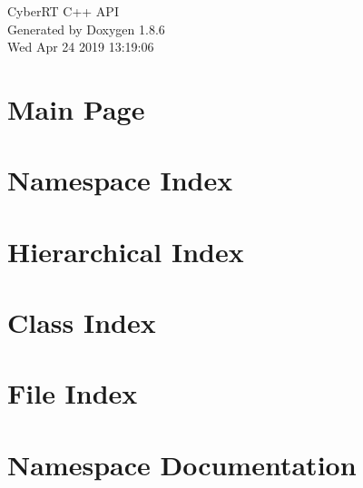 \documentclass[twoside]{book}
\newcommand{\clearemptydoublepage}{%
  \newpage{\pagestyle{empty}\cleardoublepage}%
}
\begin{document}
\hypersetup{pageanchor=false}
\begin{titlepage}
\vspace*{7cm}
\begin{center}%
{\Large Cyber\-R\-T C++ A\-P\-I }\\
\vspace*{1cm}
{\large Generated by Doxygen 1.8.6}\\
\vspace*{0.5cm}
{\small Wed Apr 24 2019 13:19:06}\\
\end{center}
\end{titlepage}
\clearemptydoublepage
\tableofcontents
\clearemptydoublepage
{}
\hypersetup{pageanchor=true}

\chapter{Main Page}
\label{index}\hypertarget{index}{}
\chapter{Namespace Index}

\chapter{Hierarchical Index}

\chapter{Class Index}

\chapter{File Index}

\chapter{Namespace Documentation}






























\end{document}
